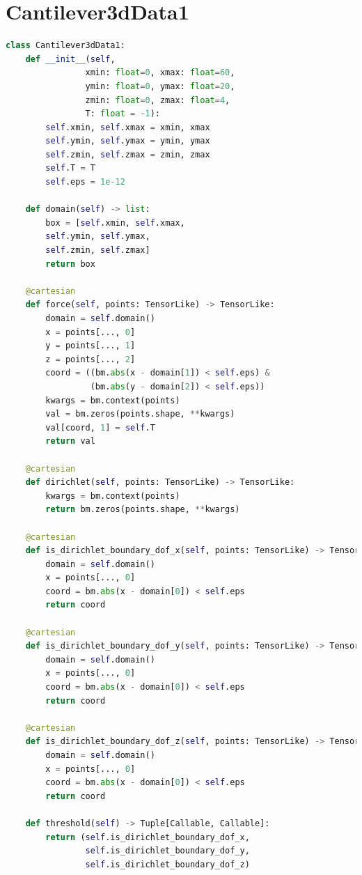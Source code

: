 \documentclass[mathpazo]{cicp}
\begin{document}
\section{Cantilever3dData1}
\label{sec:code_canti_3d}
\begin{lstlisting}[language=python]
class Cantilever3dData1:
	def __init__(self,
				xmin: float=0, xmax: float=60, 
				ymin: float=0, ymax: float=20,
				zmin: float=0, zmax: float=4,
				T: float = -1):
		self.xmin, self.xmax = xmin, xmax
		self.ymin, self.ymax = ymin, ymax
		self.zmin, self.zmax = zmin, zmax
		self.T = T 
		self.eps = 1e-12
	
	def domain(self) -> list:
		box = [self.xmin, self.xmax, 
		self.ymin, self.ymax, 
		self.zmin, self.zmax]
		return box
	
	@cartesian
	def force(self, points: TensorLike) -> TensorLike:
		domain = self.domain()
		x = points[..., 0]
		y = points[..., 1]
		z = points[..., 2]
		coord = ((bm.abs(x - domain[1]) < self.eps) & 
				 (bm.abs(y - domain[2]) < self.eps))
		kwargs = bm.context(points)
		val = bm.zeros(points.shape, **kwargs)
		val[coord, 1] = self.T
		return val
	
	@cartesian
	def dirichlet(self, points: TensorLike) -> TensorLike:
		kwargs = bm.context(points)
		return bm.zeros(points.shape, **kwargs)
	
	@cartesian
	def is_dirichlet_boundary_dof_x(self, points: TensorLike) -> TensorLike:
		domain = self.domain()
		x = points[..., 0]
		coord = bm.abs(x - domain[0]) < self.eps
		return coord
	
	@cartesian
	def is_dirichlet_boundary_dof_y(self, points: TensorLike) -> TensorLike:
		domain = self.domain()
		x = points[..., 0]
		coord = bm.abs(x - domain[0]) < self.eps
		return coord
	
	@cartesian
	def is_dirichlet_boundary_dof_z(self, points: TensorLike) -> TensorLike:
		domain = self.domain()
		x = points[..., 0]
		coord = bm.abs(x - domain[0]) < self.eps
		return coord
	
	def threshold(self) -> Tuple[Callable, Callable]:
		return (self.is_dirichlet_boundary_dof_x, 
				self.is_dirichlet_boundary_dof_y,
				self.is_dirichlet_boundary_dof_z)
\end{lstlisting}
\end{document}
